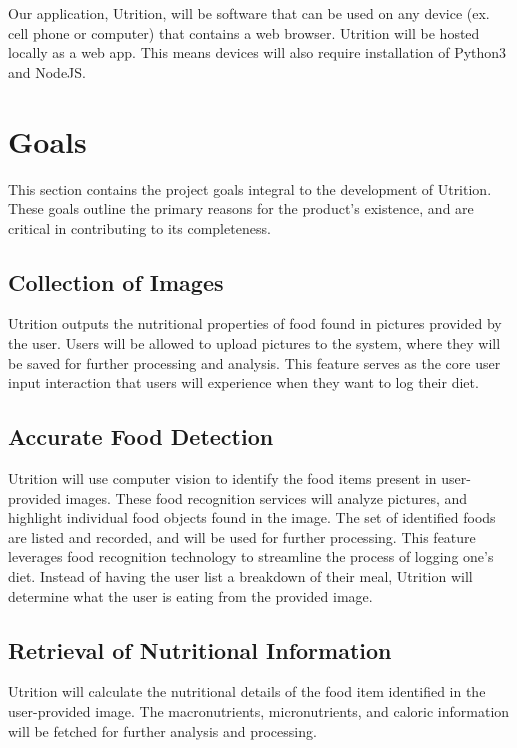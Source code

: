 \documentclass{article}
\begin{document}
Our application, Utrition, will be software that can be used on any device (ex. cell phone or computer) that contains a web browser. Utrition will be hosted locally as a web app. This means devices will also require installation of Python3 and NodeJS.

\section{Goals}

This section contains the project goals integral to the development of 
Utrition. These goals outline the primary reasons for the product's existence, 
and are critical in contributing to its completeness.

\subsection{Collection of Images}

Utrition outputs the nutritional properties of food found in pictures 
provided by the user. Users will be allowed to upload pictures to the system, 
where they will be saved for further processing and analysis. This feature 
serves as the core user input interaction that users will experience when they 
want to log their diet.

\subsection{Accurate Food Detection}

Utrition will use computer vision to identify the food items present in 
user-provided images. These food recognition services will analyze pictures, 
and highlight individual food objects found in the image. The set of identified 
foods are listed and recorded, and will be used for further processing. This 
feature leverages food recognition technology to streamline the process of 
logging one's diet. Instead of having the user list a breakdown of their meal, 
Utrition will determine what the user is eating from the provided image.

\subsection{Retrieval of Nutritional Information}

Utrition will calculate the nutritional details of the food item identified in the user-provided image. The macronutrients, micronutrients, and caloric information will be fetched for further analysis and processing.
\end{document}
